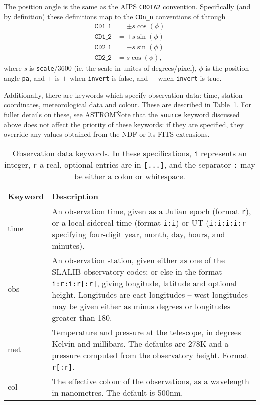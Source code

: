 \documentclass[twoside,11pt]{article}
\newcommand{\xref}[3]{#1}
\newcommand{\ASTROMref}{\xref{{\footnotesize ASTROM}}{sun5}{}}
\begin{document}
The position angle is the same as the AIPS \texttt{CROTA2}
convention. Specifically (and by definition) these definitions map to the
\texttt{CDn\_n} conventions of \cite{fitswcs2} through
\begin{align*}
\texttt{CD1\_1} & = \pm s \cos( \phi ) \\
\texttt{CD1\_2} & = \pm s \sin( \phi ) \\
\texttt{CD2\_1} & = - s \sin( \phi ) \\
\texttt{CD2\_2} & = s \cos( \phi ),
\end{align*}
where \textit{s} is \texttt{scale}/3600 (ie, the scale in unites of
degrees/pixel), $\phi$ is the position angle \texttt{pa}, and $\pm$ is $+$
when \texttt{invert} is false, and $-$ when \texttt{invert} is true.

Additionally, there are keywords which specify observation data: time, station
coordinates, meteorological data and colour.  These are described in
Table~\ref{tab:datetime}.  For fuller details on these, see \ASTROMref\.  Note
that the \texttt{source} keyword discussed above does not affect the priority
of these keywords: if they are specified, they override any values obtained
from the NDF or its FITS extensions.

\begin{table}
\begin{center}
\begin{tabular}{l|p{10cm}}
Keyword & Description \\ \hline
time & An observation time, given as a Julian epoch (format \texttt{r}), or a
local sidereal time (format \texttt{i:i}) or UT (\texttt{i:i:i:i:r} specifying
four-digit year, month, day, hours, and minutes). \\
obs & An observation station, given either as one of the SLALIB observatory
codes; or else in the format \texttt{i:r:i:r[:r]}, giving longitude, latitude
and optional height. Longitudes are east longitudes -- west longitudes may be
given either as minus degrees or longitudes greater than 180. \\
met & Temperature and pressure at the telescope, in degrees Kelvin and
millibars. The defaults are 278K and a pressure computed from the observatory
height. Format \texttt{r[:r]}. \\
col & The effective colour of the observations, as a wavelength in
nanometres. The default is 500nm.
\end{tabular}
\end{center}
\caption{\label{tab:datetime}Observation data keywords. In these
  specifications, \texttt{i} represents an integer, \texttt{r} a real,
  optional entries are in \texttt{[...]}, and the separator \texttt{:} may be
  either a colon or whitespace.}
\end{table}
\end{document}
